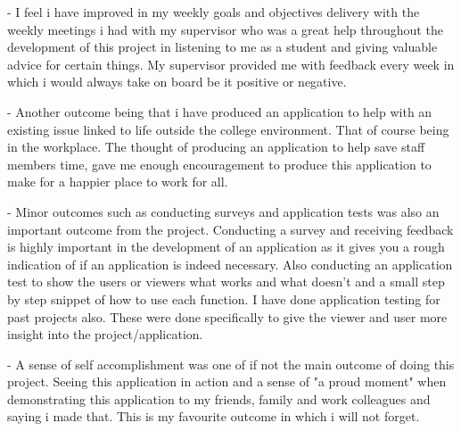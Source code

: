 - I feel i have improved in my weekly goals and objectives delivery with the weekly meetings i had with my supervisor who was a great help throughout the development of this project in listening to me as a student and giving valuable advice for certain things. My supervisor provided me with feedback every week in which i would always take on board be it positive or negative. 
\newline

- Another outcome being that i have produced an application to help with an existing issue linked to life outside the college environment. That of course being in the workplace. The thought of producing an application to help save staff members time, gave me enough encouragement to produce this application to make for a happier place to work for all.
\newline

- Minor outcomes such as conducting surveys and application tests was also an important outcome from the project. Conducting a survey and receiving feedback is highly important in the development of an application as it gives you a rough indication of if an application is indeed necessary. Also conducting an application test to show the users or viewers what works and what doesn't and a small step by step snippet of how to use each function. I have done application testing for past projects also. These were done specifically to give the viewer and user more insight into the project/application.

- A sense of self accomplishment was one of if not the main outcome of doing this project. Seeing this application in action and a sense of "a proud moment" when demonstrating this application to my friends, family and work colleagues and saying i made that. This is my favourite outcome in which i will not forget.   
\newline

